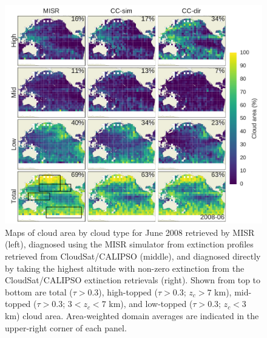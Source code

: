 \begin{figure}[htbp]
\centering
\includegraphics{graphics/misr_cldmisr_maps_2008-06.pdf}
\caption{\label{fig:misr_cldmisr_maps_june}Maps of cloud area by cloud
type for June 2008 retrieved by MISR (left), diagnosed using the MISR
simulator from extinction profiles retrieved from CloudSat/CALIPSO
(middle), and diagnosed directly by taking the highest altitude with
non-zero extinction from the CloudSat/CALIPSO extinction retrievals
(right). Shown from top to bottom are total (\(\tau > 0.3\)),
high-topped (\(\tau > 0.3\); \(z_c > 7\) km), mid-topped
(\(\tau > 0.3\); \(3 < z_c < 7\) km), and low-topped (\(\tau > 0.3\);
\(z_c < 3\) km) cloud area. Area-weighted domain averages are indicated
in the upper-right corner of each
panel.}\label{fig:misrux5fcldmisrux5fmapsux5fjune}
\end{figure}


